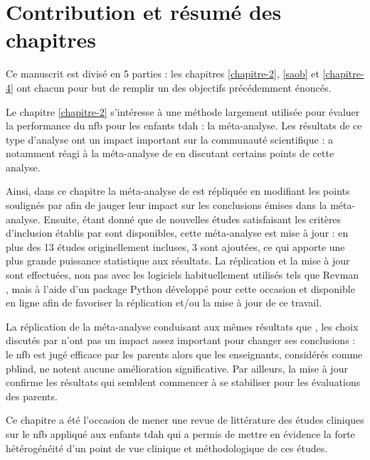 \section{Contribution et résumé des chapitres}

Ce manuscrit est divisé en 5 parties : les chapitres \ref{chapitre-2}, \ref{saob} et \ref{chapitre-4} ont chacun pour but de remplir un des objectifs précédemment énoncés.

Le chapitre \ref{chapitre-2} s'intéresse à une méthode largement utilisée pour évaluer la performance du \gls{nfb} pour les enfants \gls{tdah} 
\citep{Sonuga-Barke2013, Micoulaud2014, Cortese2016} : la méta-analyse. Les résultats de ce type d'analyse ont un impact important sur la
communauté scientifique : \citet{Micoulaud2016} a notamment réagi à la méta-analyse de \citet{Cortese2016} en discutant certains points de cette 
analyse. 

Ainsi, dans ce chapitre la méta-analyse de \citet{Cortese2016} est répliquée en modifiant les points soulignés par \citet{Micoulaud2016}
afin de jauger leur impact sur les conclusions émises dans la méta-analyse. Ensuite, étant donné que de nouvelles études satisfaisant les critères d'inclusion
établis par \citet{Cortese2016} sont disponibles, cette méta-analyse est mise à jour : en plus des 13 études originellement incluses, 3
sont ajoutées, ce qui apporte une plus grande puissance statistique aux résultats. La réplication et la mise à jour sont effectuées, non pas avec les logiciels 
habituellement utilisés tels que Revman \citep{Revman}, mais à l'aide d'un package Python développé pour cette occasion et disponible en ligne afin de favoriser 
la réplication et/ou la mise à jour de ce travail. 

La réplication de la méta-analyse conduisant aux mêmes résultats que \citet{Cortese2016}, les choix discutés par \citet{Micoulaud2016} n'ont pas un impact assez
important pour changer ses conclusions : le \gls{nfb} est jugé efficace par les parents alors que les enseignants, considérés comme \gls{pblind}, ne notent aucune
amélioration significative. Par ailleurs, la mise à jour confirme les résultats qui semblent commencer à se stabiliser pour les évaluations des parents.

Ce chapitre a été l'occasion de mener une revue de littérature des études cliniques sur le \gls{nfb} appliqué aux enfants \gls{tdah} 
qui a permis de mettre en évidence la forte hétérogénéité d'un point de vue clinique et méthodologique de ces études. 

